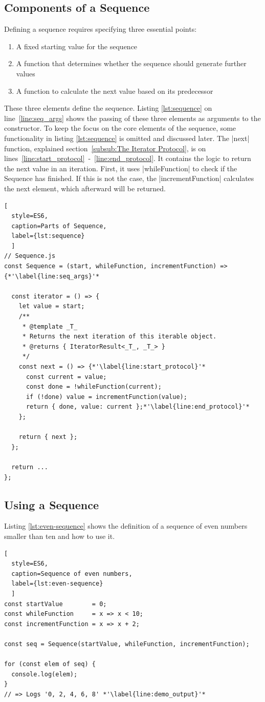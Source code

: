 \subsection{Components of a Sequence}
\label{sub:Components of a Sequence}
Defining a sequence requires specifying three essential points:
\begin{enumerate}
  \item{A fixed starting value for the sequence} 
  \item{A function that determines whether the sequence should generate
    further values} 
  \item{A function to calculate the next value based on its predecessor} 
\end{enumerate}
These three elements define the sequence. Listing \ref{lst:sequence} on
line~\ref{line:seq_args} shows the passing of these three elements as arguments
to the constructor. To keep the focus on the core elements of the sequence,
some functionality in listing \ref{lst:sequence} is omitted and discussed later.
The |next| function, explained section~\ref{subsub:The Iterator Protocol}, is on
lines~\ref{line:start_protocol}~-~\ref{line:end_protocol}. It contains the
logic to return the next value in an iteration. First, it uses |whileFunction|
to check if the Sequence has finished. If this is not the case, the
|incrementFunction| calculates the next element, which afterward will be
returned.

\begin{lstlisting}[
  style=ES6, 
  caption=Parts of Sequence,
  label={lst:sequence}
  ]
// Sequence.js
const Sequence = (start, whileFunction, incrementFunction) => {*'\label{line:seq_args}'*

  const iterator = () => {
    let value = start;
    /**
     * @template _T_
     * Returns the next iteration of this iterable object.
     * @returns { IteratorResult<_T_, _T_> }
     */
    const next = () => {*'\label{line:start_protocol}'*
      const current = value;
      const done = !whileFunction(current);
      if (!done) value = incrementFunction(value);
      return { done, value: current };*'\label{line:end_protocol}'*
    };

    return { next };
  };

  return ... 
};
\end{lstlisting}

\subsection{Using a Sequence}
\label{sub:Using a Sequence}
Listing \ref{lst:even-sequence} shows the definition of a sequence of even 
numbers smaller than ten and how to use it. 
\begin{lstlisting}[
  style=ES6, 
  caption=Sequence of even numbers,
  label={lst:even-sequence}
  ]
const startValue        = 0;
const whileFunction     = x => x < 10;
const incrementFunction = x => x + 2;

const seq = Sequence(startValue, whileFunction, incrementFunction);

for (const elem of seq) {
  console.log(elem);
}
// => Logs '0, 2, 4, 6, 8' *'\label{line:demo_output}'*
\end{lstlisting}

